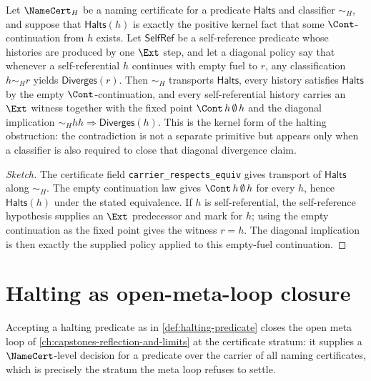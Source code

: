 \begin{theorem}
\label{thm:halting-as-form-of-distinction-fixed-point}
Let $\NameCert_H$ be a naming certificate for a predicate $\mathsf{Halts}$ and classifier $\sim_H$, and suppose that $\mathsf{Halts}(h)$ is exactly the positive kernel fact that some $\Cont$-continuation from $h$ exists. Let $\mathsf{SelfRef}$ be a self-reference predicate whose histories are produced by one $\Ext$ step, and let a diagonal policy say that whenever a self-referential $h$ continues with empty fuel to $r$, any classification $h\sim_H r$ yields $\mathsf{Diverges}(r)$. Then $\sim_H$ transports $\mathsf{Halts}$, every history satisfies $\mathsf{Halts}$ by the empty $\Cont$-continuation, and every self-referential history carries an $\Ext$ witness together with the fixed point $\Cont\,h\,\emptyset\,h$ and the diagonal implication $\sim_H h h \Rightarrow \mathsf{Diverges}(h)$. This is the kernel form of the halting obstruction: the contradiction is not a separate primitive but appears only when a classifier is also required to close that diagonal divergence claim.
\end{theorem}

\begin{proof}[Sketch]
The certificate field \texttt{carrier\_respects\_equiv} gives transport of $\mathsf{Halts}$ along $\sim_H$. The empty continuation law gives $\Cont\,h\,\emptyset\,h$ for every $h$, hence $\mathsf{Halts}(h)$ under the stated equivalence. If $h$ is self-referential, the self-reference hypothesis supplies an $\Ext$ predecessor and mark for $h$; using the empty continuation as the fixed point gives the witness $r=h$. The diagonal implication is then exactly the supplied policy applied to this empty-fuel continuation.
\end{proof}

\section{Halting as open-meta-loop closure}
\label{sec:halting-meta-loop-closure}

\begin{theorem}
\label{thm:halting-meta-loop-closure}
Accepting a halting predicate as in \autoref{def:halting-predicate} closes the open meta loop of \autoref{ch:capstones-reflection-and-limits} at the certificate stratum: it supplies a $\NameCert$-level decision for a predicate over the carrier of all naming certificates, which is precisely the stratum the meta loop refuses to settle.
\end{theorem}

